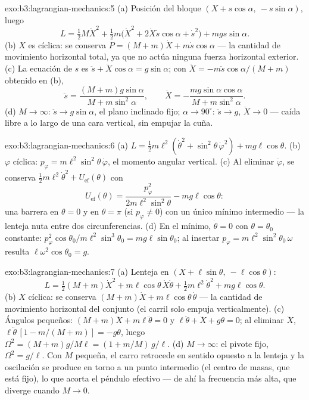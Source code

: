 \begin{solution}{exo:b3:lagrangian-mechanics:5}
(a) Posición del bloque $(X + s\cos\alpha,\ -s\sin\alpha)$, luego
\[
L = \tfrac12 M\dot X^2 + \tfrac12 m\big(\dot X^2 +
2\dot X\dot s\cos\alpha + \dot s^2\big) + mgs\sin\alpha .
\]
(b) $X$ es cíclica: se conserva $P = (M + m)\dot X + m\dot s\cos\alpha$ ---
la cantidad de movimiento horizontal total, ya que no actúa ninguna fuerza
horizontal exterior. (c) La ecuación de $s$ es $\ddot s + \ddot
X\cos\alpha = g\sin\alpha$; con $\ddot X = -m\ddot s\cos\alpha/(M +
m)$ obtenido en (b),
\[
\ddot s = \frac{(M + m)g\sin\alpha}{M + m\sin^2\alpha} , \qquad
\ddot X = -\frac{mg\sin\alpha\cos\alpha}{M + m\sin^2\alpha} .
\]
(d) $M \to \infty$: $\ddot s \to g\sin\alpha$, el plano inclinado fijo;
$\alpha \to 90^\circ$: $\ddot s \to g$, $\ddot X \to 0$ --- caída libre a lo
largo de una cara vertical, sin empujar la cuña.
\end{solution}

\begin{solution}{exo:b3:lagrangian-mechanics:6}
(a) $L = \tfrac12 m\ell^2(\dot\theta^2 + \sin^2\theta\,\dot\varphi^2) +
mg\ell\cos\theta$. (b) $\varphi$ cíclica: $p_\varphi =
m\ell^2\sin^2\theta\,\dot\varphi$, el momento angular vertical. (c) Al
eliminar $\dot\varphi$, se conserva $\tfrac12 m\ell^2\dot\theta^2 +
U_{\text{ef}}(\theta)$ con
\[
U_{\text{ef}}(\theta) = \frac{p_\varphi^2}{2m\ell^2\sin^2\theta}
 - mg\ell\cos\theta :
\]
una barrera en $\theta = 0$ y en $\theta = \pi$ (si $p_\varphi \neq 0$) con
un único mínimo intermedio --- la lenteja nuta entre dos circunferencias.
(d) En el mínimo, $\dot\theta = 0$ con $\theta = \theta_0$ constante:
$p_\varphi^2\cos\theta_0/m\ell^2\sin^3\theta_0 = mg\ell\sin\theta_0$; al
insertar $p_\varphi = m\ell^2\sin^2\theta_0\,\omega$ resulta
$\ell\omega^2\cos\theta_0 = g$.
\end{solution}

\begin{solution}{exo:b3:lagrangian-mechanics:7}
(a) Lenteja en $(X + \ell\sin\theta,\ -\ell\cos\theta)$:
\[
L = \tfrac12(M + m)\dot X^2 + m\ell\cos\theta\,\dot X\dot\theta
 + \tfrac12 m\ell^2\dot\theta^2 + mg\ell\cos\theta .
\]
(b) $X$ cíclica: se conserva $(M + m)\dot X + m\ell\cos\theta\,\dot\theta$
--- la cantidad de movimiento horizontal del conjunto (el carril solo empuja
verticalmente). (c) Ángulos pequeños: $(M + m)\ddot X +
m\ell\ddot\theta = 0$ y $\ell\ddot\theta + \ddot X + g\theta = 0$; al
eliminar $\ddot X$, $\ell\ddot\theta\,[1 - m/(M + m)] = -g\theta$, luego
$\Omega^2 = (M + m)g/M\ell = (1 + m/M)\,g/\ell$. (d) $M \to \infty$: el
pivote fijo, $\Omega^2 = g/\ell$. Con $M$ pequeña, el carro retrocede en
sentido opuesto a la lenteja y la oscilación se produce en torno a un punto
intermedio (el centro de masas, que está fijo), lo que acorta el péndulo
efectivo --- de ahí la frecuencia más alta, que diverge cuando $M \to 0$.
\end{solution}

